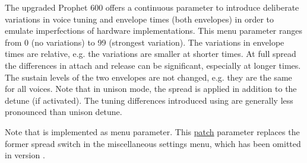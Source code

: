 The upgraded Prophet 600 offers a continuous parameter to introduce deliberate variations in voice tuning and envelope times (both envelopes) in  order to emulate imperfections of hardware implementations. This menu parameter \vintage ranges from 0 (no variations) to 99 (strongest variation). The variations in envelope times are relative, e.g. the variations are smaller at shorter times. At full spread the differences in attach and release can be significant, especially at longer times. The sustain levels of the two envelopes are not changed, e.g. they are the same for all voices. Note that in unison mode, the spread is applied in addition to the detune (if activated). The tuning differences introduced using \vintage are generally less pronounced than unison detune.

Note that \vintage is implemented as menu parameter. This \underline{patch} parameter replaces the former spread switch in the miscellaneous settings menu, which has been omitted in version \version.

